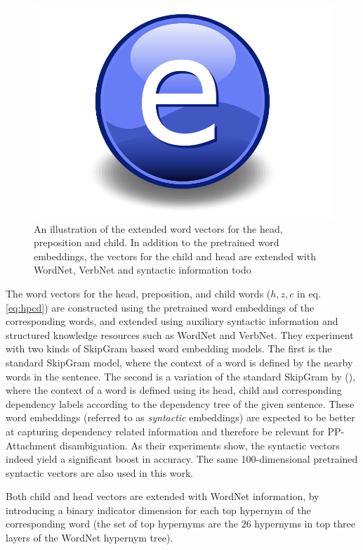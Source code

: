 \begin{figure}
    \centering
    \includegraphics{Figures/Electron.pdf}
    \caption{An illustration of the extended word vectors for the head, preposition and child. In addition to the pretrained word embeddings, the vectors for the child and head are extended with WordNet, VerbNet and syntactic information todo}
    \label{fig:hpcdvectors}
\end{figure}

The word vectors for the head, preposition, and child words ($h, z, c$ in eq. \ref{eq:hpcd}) are constructed using the pretrained word embeddings of the corresponding words, and extended using auxiliary syntactic information and structured knowledge resources such as WordNet and VerbNet. They experiment with two kinds of SkipGram based word embedding models. The first is the standard SkipGram model, where the context of a word is defined by the nearby words in the sentence. The second is a variation of the standard SkipGram by (\cite{bansal}), where the context of a word is defined using its head, child and corresponding dependency labels according to the dependency tree of the given sentence. These word embeddings (referred to as \textit{syntactic} embeddings) are expected to be better at capturing dependency related information and therefore be relevant for PP-Attachment disambiguation. As their experiments show, the syntactic vectors indeed yield a significant boost in accuracy. The same 100-dimensional pretrained syntactic vectors are also used in this work. 

Both child and head vectors are extended with WordNet information, by introducing a binary indicator dimension for each top hypernym of the corresponding word (the set of top hypernyms are the 26 hypernyms in top three layers of the WordNet hypernym tree). 

